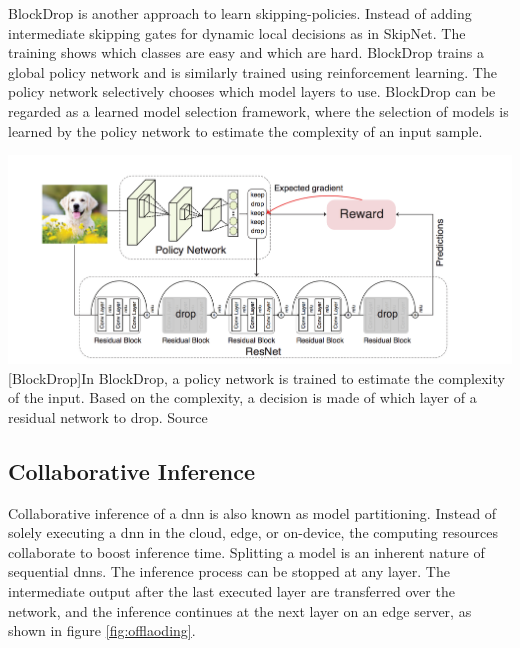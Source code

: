 \begin{enumdescript}
	BlockDrop \cite{wu_blockdrop:_2017} is another approach to learn skipping-policies. Instead of adding intermediate skipping gates for dynamic local decisions as in SkipNet. The training shows which classes are easy and which are hard. BlockDrop trains a global policy network and is similarly trained using reinforcement learning.  The policy network selectively chooses which model layers to use. BlockDrop can be regarded as a learned model selection framework, where the selection of models is learned by the policy network to estimate the complexity of an input sample. 
	
	
	\begin{minipage}[t]{\linewidth}    
		\centering
		\includegraphics[width=\linewidth]{figures/models/blockdrop}
		[BlockDrop]{In BlockDrop, a policy network is trained to estimate the complexity of the input. Based on the complexity, a decision is made of which layer of a residual network to drop. Source  \cite{wu_blockdrop:_2017}}
	\end{minipage}	
	
	
\end{enumdescript}

\subsection{Collaborative Inference}

Collaborative inference of a \gls{dnn} is also known as model partitioning. Instead of solely executing a \gls{dnn} in the cloud, edge, or on-device, the computing resources collaborate to boost inference time. Splitting a model is an inherent nature of sequential \gls{dnn}s. The inference process can be stopped at any layer. The intermediate output after the last executed layer are transferred over the network, and the inference continues at the next layer on an edge server, as shown in figure \ref{fig:offlaoding}.


